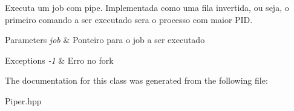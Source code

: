 Executa um job com pipe. Implementada como uma fila invertida, ou seja, o primeiro comando a ser executado sera o processo com maior PID. 


\begin{DoxyParams}{Parameters}
{\em job} & Ponteiro para o job a ser executado \\
\hline
\end{DoxyParams}

\begin{DoxyExceptions}{Exceptions}
{\em -\/1} & Erro no fork \\
\hline
\end{DoxyExceptions}


The documentation for this class was generated from the following file:\begin{DoxyCompactItemize}
\item 
Piper.hpp\end{DoxyCompactItemize}
